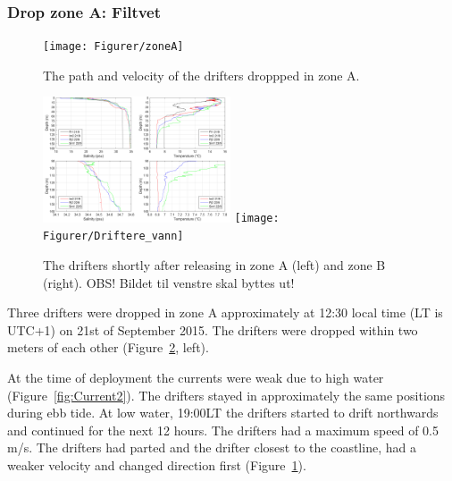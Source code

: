 \documentclass[12pt,a4paper,english]{article}
\begin{document}
\subsubsection{Drop zone A: Filtvet}
%
\begin{figure}[ht]
\centerline{
\texttt{[image: Figurer/zoneA]}}
\caption{\small
The path and velocity of the drifters droppped in zone A.%
}
\label{fig:ZoneA}
\end{figure}
%
%
\begin{figure}[ht]
\centerline{
\includegraphics*[width=0.495\textwidth]{Figurer/Fig_profiles}
\texttt{[image: Figurer/Driftere\_vann]}
}
\caption{\small
The drifters shortly after releasing in zone A (left) and zone B (right). OBS! Bildet til venstre skal byttes ut!
}
\label{fig:DriftereVann}
\end{figure}

Three drifters were dropped in zone A approximately at 12:30 local time (LT is UTC+1) on 21st of September 2015. The drifters were dropped within two meters of each other (Figure~\ref{fig:DriftereVann}, left).

At the time of deployment the currents were weak due to high water (Figure~\ref{fig:Current2}). The drifters stayed in approximately the same positions during ebb tide. At low water, 19:00LT the drifters started to drift northwards and continued for the next 12 hours. The drifters had a maximum speed of 0.5 m/s.%
The drifters had parted and the drifter closest to the coastline, had a weaker velocity and changed direction first (Figure~\ref{fig:ZoneA}). 
\end{document}
